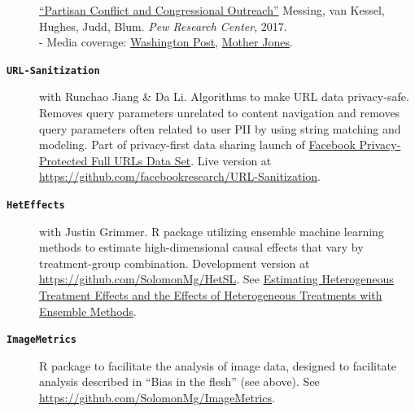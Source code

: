 \documentclass[letterpaper,11pt]{article}
\newcommand{\resheading}[1]{\vspace{4pt}{\large
\colorbox{mygrey}{\begin{minipage}{\textwidth}{\textbf{#1
\vphantom{p\^{E}}}}\end{minipage}}}\vspace{4pt}}
\begin{document}
\begin{description}
\item[] \href{http://www.people-press.org/2017/02/23/partisan-conflict-and-congressional-outreach/}{``Partisan Conflict and Congressional Outreach''} Messing, van Kessel, Hughes, Judd, Blum. 
\emph{Pew Research Center}, 2017.  \\
- Media coverage: \href{https://www.washingtonpost.com/news/wonk/wp/2017/02/23/republican-lawmakers-go-negative-more-often-than-democrats-according-to-a-first-of-its-kind-analysis/}{Washington Post}, \href{http://www.motherjones.com/kevin-drum/2017/02/pew-republicans-disagree-and-they-disagree-indignantly/}{Mother Jones}.

\end{description}

\resheading{Software}
 
\begin{description}

\item[\large{\textbf{\texttt{URL-Sanitization}}}] with Runchao Jiang \& Da Li. Algorithms to make URL data privacy-safe. Removes query parameters unrelated to content navigation and removes query parameters often related to user PII by using string matching and modeling. Part of privacy-first data sharing launch of \href{https://solomonmg.github.io/pdf/Facebook_DP_URLs_Dataset.pdf}{Facebook Privacy-Protected Full URLs Data Set}. Live version at \url{https://github.com/facebookresearch/URL-Sanitization}.

\item[\large{\textbf{\texttt{HetEffects}}}] with Justin Grimmer. R package utilizing ensemble machine learning methods to estimate high-dimensional causal effects that vary by treatment-group combination. Development version at \url{https://github.com/SolomonMg/HetSL}. See \href{http://stanford.edu/~jgrimmer/het.pdf}{Estimating Heterogeneous Treatment Effects and the Effects of Heterogeneous Treatments with Ensemble Methods}.

\item[\large{\textbf{\texttt{ImageMetrics}}}] R package to facilitate the analysis of image data,
designed to facilitate analysis described in ``Bias in the flesh'' (see above). See \url{https://github.com/SolomonMg/ImageMetrics}.



\end{description}
\end{document}
